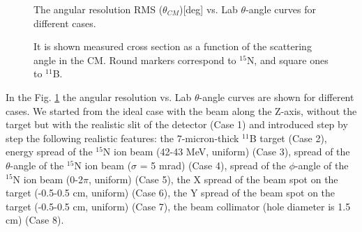 \documentclass[%
 aip,
cp,  %
 amsmath,amssymb,%
 reprint,%
]{revtex4-2}
\begin{document}
\begin{figure}[h]
\caption{The angular resolution RMS ($\theta_{CM}$)[deg] vs. Lab $\theta$-angle curves for different cases.}
\label{ris:fig3}
\end{figure}

\begin{figure}[h!]
\caption{It is shown measured cross section as a function of the scattering angle in the CM. Round markers correspond to ${}^{15}$N, and
square ones to ${}^{11}$B.}
\label{ris:fig4}
\end{figure}


In the Fig. \ref{ris:fig3} the angular resolution vs. Lab $\theta$-angle curves are shown for different cases. We started from the ideal case with the beam along the Z-axis, without the target but with the realistic slit of the detector (Case 1) and introduced step by step the following realistic features: the 7-micron-thick ${}^{11}$B target (Case 2), energy spread of the ${}^{15}$N ion beam (42-43 MeV, uniform) (Case 3), spread of the $\theta$-angle of the ${}^{15}$N ion beam ($\sigma$ = 5 mrad) (Case 4),  spread of the $\phi$-angle of the ${}^{15}$N ion beam (0-2$\pi$, uniform) (Case 5), the X spread of the beam spot on the target (-0.5-0.5 cm, uniform) (Case 6), the Y spread of the beam spot on the target (-0.5-0.5 cm, uniform) (Case 7), the beam collimator (hole diameter is 1.5 cm)  (Case 8).
\end{document}
